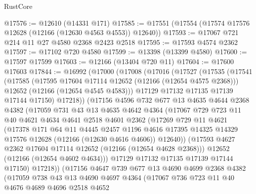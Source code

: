 \begin{lexlean}{RustCore}
\begin{coremodule}
@17576 := @12610 (@14331 @171)
@17585 := @17551 (@17554 (@17574 @17576 @12628 (@12166 (@12630 @4563 @4553)) @12640))
@17593 := @17067 @721 @214 @11 @27 @4580 @2368 @2423 @2518
@17595 := @17593 @4574 @2362
@17597 := @17102 @720 @4580
@17599 := @13398 (@13399 @4580)
@17600 := @17597 @17599
@17603 := @12166 (@13404 @720 @11)
@17604 := @17600 @17603
@17844 := @16992
    (@17000
      (@17008
        (@17016
          (@17527
            (@17535
              (@17541
                (@17585
                  (@17595 @17604 @17114 @12652 (@12166 (@12654 @4575 @2368)))
                  @12652
                  (@12166 (@12654 @4545 @4583)))
                @17129
                @17132
                @17135
                @17139
                @17144
                @17150)
              @17218))
          (@17156
            @4596
            @732
            @677
            @13
            @4635
            @4644
            @2368
            @4382
            (@17059
              @731
              @43
              @13
              @4635
              @4642
              @4364
              (@17067
                @729
                @723
                @11
                @40
                @4621
                @4634
                @4641
                @2518
                @4601
                @2362
                (@17269
                  @729
                  @11
                  @4621
                  (@17378
                    @171
                    @64
                    @11
                    @4445
                    @2457
                    @1196
                    @4616
                    @17395
                    @14325
                    @14329
                    @17576
                    @12628
                    (@12166 (@12630 @4616 @4606))
                    @12640))
                (@17593 @4627 @2362 @17604 @17114 @12652 (@12166 (@12654 @4628 @2368)))
                @12652
                (@12166 (@12654 @4602 @4634)))
              @17129
              @17132
              @17135
              @17139
              @17144
              @17150)
            @17218))
        (@17156
          @4647
          @739
          @677
          @13
          @4690
          @4699
          @2368
          @4382
          (@17059
            @738
            @43
            @13
            @4690
            @4697
            @4364
            (@17067
              @736
              @723
              @11
              @40
              @4676
              @4689
              @4696
              @2518
              @4652

\end{coremodule}
\end{lexlean}
